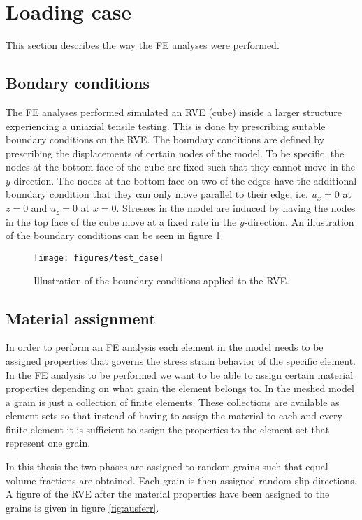 \documentclass[crystal_plast.tex]{subfiles}
\begin{document}
\section{Loading case}

This section describes the way the FE analyses were performed.


\subsection{Bondary conditions}
The FE analyses performed simulated an RVE (cube) inside a larger structure experiencing a uniaxial tensile testing. This is done by prescribing suitable boundary conditions on the RVE. The boundary conditions are defined by prescribing the displacements of certain nodes of the model. To be specific, the nodes at the bottom face of the cube are fixed such that they cannot move in the $y$-direction. The nodes at the bottom face on two of the edges have the additional boundary condition that they can only move parallel to their edge, i.e. $u_x = 0$ at $z = 0$ and $u_z = 0$ at $x = 0$. Stresses in the model are induced by having the nodes in the top face of the cube move at a fixed rate in the $y$-direction. An illustration of the boundary conditions can be seen in figure \ref{fig:test_case}. 


\begin{figure}[htpb!]
\centering
\texttt{[image: figures/test\_case]}
\caption{Illustration of the boundary conditions applied to the RVE.}
\label{fig:test_case}
\end{figure}

\subsection{Material assignment}

In order to perform an FE analysis each element in the model needs to be assigned properties that governs the stress strain behavior of the specific element. In the FE analysis to be performed we want to be able to assign certain material properties depending on what grain the element belongs to. In the meshed model a grain is just a collection of finite elements. These collections are available as element sets so that instead of having to assign the material to each and every finite element it is sufficient to assign the properties to the element set that represent one grain.

In this thesis the two phases are assigned to random grains such that equal volume fractions are obtained. Each grain is then assigned random slip directions. A figure of the RVE after the material properties have been assigned to the grains is given in figure \ref{fig:ausferr}. 
\end{document}

